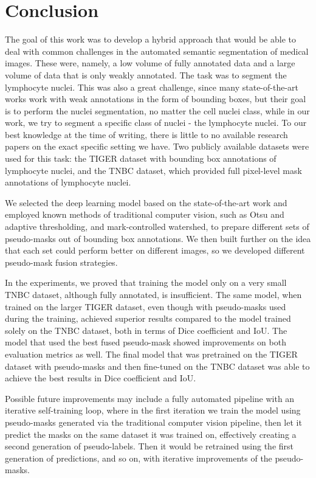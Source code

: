 \chapter{Conclusion}

The goal of this work was to develop a hybrid approach that would be able to deal with common challenges in the automated semantic segmentation of medical images. These were, namely, a low volume of fully annotated data and a large volume of data that is only weakly annotated. The task was to segment the lymphocyte nuclei. This was also a great challenge, since many state-of-the-art works work with weak annotations in the form of bounding boxes, but their goal is to perform the nuclei segmentation, no matter the cell nuclei class, while in our work, we try to segment a specific class of nuclei - the lymphocyte nuclei. To our best knowledge at the time of writing, there is little to no available research papers on the exact specific setting we have. Two publicly available datasets were used for this task: the TIGER dataset \cite{tiger_dataset} with bounding box annotations of lymphocyte nuclei, and the TNBC \cite{TNBC-nuclei-seg-extended} dataset, which provided full pixel-level mask annotations of lymphocyte nuclei. 

We selected the deep learning model based on the state-of-the-art work and employed known methods of traditional computer vision, such as Otsu and adaptive thresholding, and mark-controlled watershed, to prepare different sets of pseudo-masks out of bounding box annotations. We then built further on the idea that each set could perform better on different images, so we developed different pseudo-mask fusion strategies.

In the experiments, we proved that training the model only on a very small TNBC dataset, although fully annotated, is insufficient. The same model, when trained on the larger TIGER dataset, even though with pseudo-masks used during the training, achieved superior results compared to the model trained solely on the TNBC dataset, both in terms of Dice coefficient and IoU. The model that used the best fused pseudo-mask showed improvements on both evaluation metrics as well. The final model that was pretrained on the TIGER dataset with pseudo-masks and then fine-tuned on the TNBC dataset was able to achieve the best results in Dice coefficient and IoU.

Possible future improvements may include a fully automated pipeline with an iterative self-training loop, where in the first iteration we train the model using pseudo-masks generated via the traditional computer vision pipeline, then let it predict the masks on the same dataset it was trained on, effectively creating a second generation of pseudo-labels. Then it would be retrained using the first generation of predictions, and so on, with iterative improvements of the pseudo-masks.


